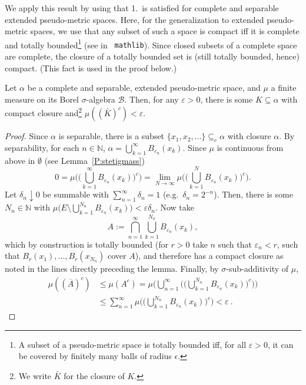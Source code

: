 \documentclass[lean]{DraftAFM}
\begin{document}
We apply this result by using that 1.\ is satisfied for complete and
separable extended pseudo-metric spaces. Here, for the generalization
to extended pseudo-metric spaces, we use that any subset of such a
space is compact iff it is complete and totally
bounded\footnote{\label{note:tot}A subset of a pseudo-metric space is
  totally bounded iff, for all $\varepsilon>0$, it can be covered by
  finitely many balls of radius $\epsilon$.} (see
 in {\tt
  mathlib}). Since closed subsets of a complete space are complete,
the closure of a totally bounded set is (still totally bounded, hence)
compact. (This fact is used in the proof below.)

\begin{lemma}\label{L:relcoPol}
  Let $\alpha$ be a complete and separable, extended pseudo-metric
  space, and $\mu$ a finite measure on its Borel $\sigma$-algebra
  $\mathcal B$. Then, for any $\varepsilon>0$, there is some
  $K\subseteq \alpha$ with compact closure and\footnote{We write $\bar
    K$ for the closure of $K$.}  $\mu((\bar K)^c)<\varepsilon$.
\end{lemma}

\begin{proof}
 Since $\alpha$ is separable, there is a subset $\{x_1, x_2,...\}
 \subseteq_c \alpha$ with closure $\alpha$. By separability, for each
 $n\in \mathbb N$, $\alpha = \bigcup_{k=1}^\infty
 B_{\varepsilon_n}(x_k)$. Since $\mu$ is continuous from above in
 $\emptyset$ (see Lemma~\ref{P:stetigmass})
  \[
  0 = \mu\Big(\Big(\bigcup_{k=1}^\infty B_{\varepsilon_n}(x_k)\Big)^c
  \Big) = \lim_{N\to\infty} \mu\Big( \Big(\bigcup_{k=1}^N
  B_{\varepsilon_n}(x_k)\Big)^c\Big).
  \]
  Let $\delta_n\downarrow 0$ be summable with $\sum_{n=1}^\infty
  \delta_n = 1$ (e.g.\ $\delta_n = 2^{-n}$). Then, there is some
  $N_n\in\mathbb N$ with $\mu\Big( E\setminus \bigcup_{k=1}^{N_n}
  B_{\varepsilon_n}(x_k)\Big) < \varepsilon \delta_n$. Now take
  \[
    A := \bigcap_{n=1}^\infty \bigcup_{k=1}^{N_n}
    B_{\varepsilon_n}(x_k),
  \]
  which by construction is totally bounded (for $r>0$ take $n$ such
  that $\varepsilon_n < r$, such that $B_r(x_1),...,B_r(x_{N_n})$
  cover $A$), and therefore has a compact closure as noted
  in the lines directly preceding the lemma. Finally, by $\sigma$-sub-additivity of $\mu$,
  \begin{align*}
     \mu((\overline A)^c) & \leq \mu(A^c) = \mu\Big(
     \bigcup_{n=1}^\infty \Big(\Big(\bigcup_{k=1}^{N_n}
     B_{\varepsilon_n}(x_k)\Big)^c\Big)\Big) \\ & \leq
     \sum_{n=1}^\infty \mu\Big( \Big(\bigcup_{k=1}^{N_n}
     B_{\varepsilon_n}(x_k)\Big)^c\Big)< \varepsilon
     \: .
  \end{align*}
\end{proof}
\end{document}
